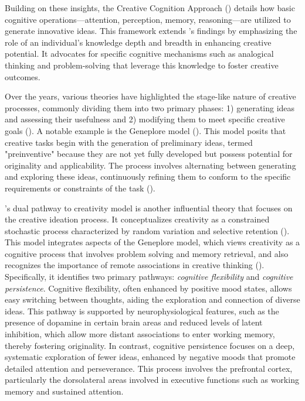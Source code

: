 \documentclass[../MA_Thesis.tex]{subfiles}
\begin{document}
Building on these insights, the Creative Cognition Approach (\cite{kaufman_cambridge_2010}) details how basic cognitive operations---attention, perception, memory, reasoning---are utilized to generate innovative ideas. This framework extends \textcite{dietrich_cognitive_2004}'s findings by emphasizing the role of an individual’s knowledge depth and breadth in enhancing creative potential. It advocates for specific cognitive mechanisms such as analogical thinking and problem-solving that leverage this knowledge to foster creative outcomes.

Over the years, various theories have highlighted the stage-like nature of creative processes, commonly dividing them into two primary phases: 1) generating ideas and assessing their usefulness and 2) modifying them to meet specific creative goals (\cite{johnson_divergent_2022}). A notable example is the Geneplore model (\cite{finke_creative_1996}). This model posits that creative tasks begin with the generation of preliminary ideas, termed "preinventive" because they are not yet fully developed but possess potential for originality and applicability. The process involves alternating between generating and exploring these ideas, continuously refining them to conform to the specific requirements or constraints of the task (\cite{patterson_personal_2004}).

\textcite{nijstad_dual_2010}'s dual pathway to creativity model is another influential theory that focuses on the creative ideation process. It conceptualizes creativity as a constrained stochastic process characterized by random variation and selective retention (\cite{simonton_creativity_2000}). This model integrates aspects of the Geneplore model, which views creativity as a cognitive process that involves problem solving and memory retrieval, and also recognizes the importance of remote associations in creative thinking (\cite{mednick_associative_1962}). Specifically, it identifies two primary pathways: \textit{cognitive flexibility} and \textit{cognitive persistence}. Cognitive flexibility, often enhanced by positive mood states, allows easy switching between thoughts, aiding the exploration and connection of diverse ideas. This pathway is supported by neurophysiological features, such as the presence of dopamine in certain brain areas and reduced levels of latent inhibition, which allow more distant associations to enter working memory, thereby fostering originality. In contrast, cognitive persistence focuses on a deep, systematic exploration of fewer ideas, enhanced by negative moods that promote detailed attention and perseverance. This process involves the prefrontal cortex, particularly the dorsolateral areas involved in executive functions such as working memory and sustained attention.
\end{document}
